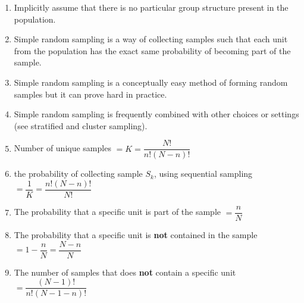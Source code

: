\begin{enumerate}[itemsep=0.2cm]
    \item Implicitly assume that there is no particular group structure present in the population.
    \hfill \cite{statistics/book/Statistics-for-Data-Scientists/Maurits-Kaptein}
    
    \item Simple random sampling is a way of collecting samples such that each unit from the population has the exact same probability of becoming part of the sample. 
    \hfill \cite{statistics/book/Statistics-for-Data-Scientists/Maurits-Kaptein}

    
    \item Simple random sampling is a conceptually easy method of forming random samples but it can prove hard in practice.
    \hfill \cite{statistics/book/Statistics-for-Data-Scientists/Maurits-Kaptein}

    \item Simple random sampling is frequently combined with other choices or settings (see stratified and cluster sampling).
    \hfill \cite{statistics/book/Statistics-for-Data-Scientists/Maurits-Kaptein}

    \item Number of unique samples $
        = K 
        = \dfrac{N!}{n!(N-n)!}
    $
    \hfill \cite{statistics/book/Statistics-for-Data-Scientists/Maurits-Kaptein}

    \item the probability of collecting sample $S_k$, using sequential sampling $
        = \dfrac{1}{K} 
        = \dfrac{n!(N-n)!}{N!}
    $
    \hfill \cite{statistics/book/Statistics-for-Data-Scientists/Maurits-Kaptein}

    \item The probability that a specific unit is part of the sample $
        = \dfrac{n}{N}
    $
    \hfill \cite{statistics/book/Statistics-for-Data-Scientists/Maurits-Kaptein}

    \item The probability that a specific unit is \textbf{not} contained in the sample $
        = 1 - \dfrac{n}{N}
        = \dfrac{N-n}{N}
    $
    \hfill \cite{statistics/book/Statistics-for-Data-Scientists/Maurits-Kaptein}

    \item The number of samples that does \textbf{not} contain a specific unit $
        = \dfrac{(N - 1)!}{n!(N - 1 - n)!}
    $
    \hfill \cite{statistics/book/Statistics-for-Data-Scientists/Maurits-Kaptein}


\end{enumerate}
